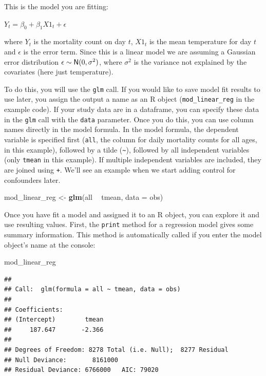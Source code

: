\documentclass[
]{book}
\newenvironment{Shaded}{\begin{snugshade}}{\end{snugshade}}
\newcommand{\DataTypeTok}[1]{\textcolor[rgb]{0.13,0.29,0.53}{#1}}
\newcommand{\KeywordTok}[1]{\textcolor[rgb]{0.13,0.29,0.53}{\textbf{#1}}}
\newcommand{\NormalTok}[1]{#1}
\newcommand{\OperatorTok}[1]{\textcolor[rgb]{0.81,0.36,0.00}{\textbf{#1}}}
\newcommand{\StringTok}[1]{\textcolor[rgb]{0.31,0.60,0.02}{#1}}
\begin{document}
This is the model you are fitting:

\(Y_{t}=\beta_{0}+\beta_{1}X1_{t}+\epsilon\)

where \(Y_{t}\) is the mortality count on day \(t\), \(X1_{t}\) is the mean temperature
for day \(t\) and \(\epsilon\) is the error term. Since this is a linear model we are
assuming a Gaussian error distribution \(\epsilon \sim {\sf N}(0, \sigma^{2})\),
where \(\sigma^{2}\) is the variance not explained by the covariates (here just
temperature).

To do this, you will use the \texttt{glm} call. If you would like to save model fit
results to use later, you assign the output a name as an R object
(\texttt{mod\_linear\_reg} in the example code). If your study data are in a dataframe,
you can specify these data in the \texttt{glm} call with the \texttt{data} parameter.
Once you do this, you can use column names directly in the model formula.
In the model formula, the dependent variable is specified first (\texttt{all}, the
column for daily mortality counts for all ages, in this example), followed
by a tilde (\texttt{\textasciitilde{}}), followed by all independent variables (only \texttt{tmean} in this
example). If multiple independent variables are included, they are joined using
\texttt{+}. We'll see an example when we start adding control for confounders later.

\begin{Shaded}
\begin{Highlighting}[]
\NormalTok{mod_linear_reg <-}\StringTok{ }\KeywordTok{glm}\NormalTok{(all }\OperatorTok{~}\StringTok{ }\NormalTok{tmean, }\DataTypeTok{data =}\NormalTok{ obs)}
\end{Highlighting}
\end{Shaded}

Once you have fit a model and assigned it to an R object, you can explore it
and use resulting values. First, the \texttt{print} method for a regression model
gives some summary information. This method is automatically called if you
enter the model object's name at the console:

\begin{Shaded}
\begin{Highlighting}[]
\NormalTok{mod_linear_reg}
\end{Highlighting}
\end{Shaded}

\begin{verbatim}
## 
## Call:  glm(formula = all ~ tmean, data = obs)
## 
## Coefficients:
## (Intercept)        tmean  
##     187.647       -2.366  
## 
## Degrees of Freedom: 8278 Total (i.e. Null);  8277 Residual
## Null Deviance:       8161000 
## Residual Deviance: 6766000   AIC: 79020
\end{verbatim}
\end{document}
